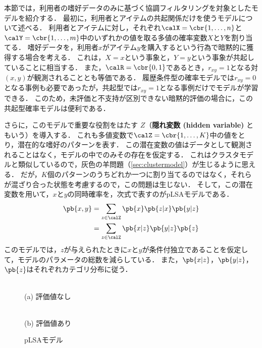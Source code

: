 本節では，利用者の嗜好データのみに基づく協調フィルタリングを対象としたモデル\cite{ijcai:99:01}を紹介する．
最初に，利用者とアイテムの共起関係だけを使うモデルについて述べる．
利用者とアイテムに対し，それぞれ$\calX=\cbr{1,\ldots,n}$と$\calY=\cbr{1,\ldots,m}$中のいずれかの値を取る多値の確率変数$X$と$Y$を割り当てる．
嗜好データを，利用者$x$がアイテム$y$を購入するという行為で暗黙的に獲得する場合を考える．
これは，$X=x$という事象と，$Y=y$という事象が共起していることに相当する．
また，$\calR=\cbr{0,1}$であるとき，$r_{xy}=1$となる対$(x,y)$が観測されることとも等価である．
履歴条件型の確率モデルでは$r_{xy}=0$となる事例も必要であったが，共起型では$r_{xy}=1$となる事例だけでモデルが学習できる．
このため，未評価と不支持が区別できない暗黙的評価の場合に，この共起型確率モデルは便利である．

さらに，このモデルで重要な役割をはたす $Z$（\textbf{隠れ変数 (hidden variable)} ともいう）を導入する．
これも多値変数で$\calZ=\cbr{1,\ldots,K}$中の値をとり，潜在的な嗜好のパターンを表す．
この潜在変数の値はデータとして観測されることはなく，モデルの中でのみその存在を仮定する．
これはクラスタモデルと類似しているので，灰色の羊問題（\ref{sec:clustermodel}）が生じるように思える．
だが，$K$個のパターンのうちどれか一つに割り当てるのではなく，それらが混ざり合った状態を考慮するので，この問題は生じない．
そして，この潜在変数を用いて，$x$と$y$の同時確率を，次式で表すのがpLSAモデルである．
\begin{align}
 \pb{x,y}& = \sum_{z\in \calZ}\pb{x}\pb{z|x}\pb{y|z}\label{eq:origplsamodel}\\
& = \sum_{z\in \calZ}\pb{x|z}\pb{y|z}\pb{z}
\label{eq:plsamodel}
\end{align}
このモデルでは，$z$が与えられたときに$x$と$y$が条件付独立であることを仮定して，モデルのパラメータの総数を減らしている．
また，$\pb{x|z}$，$\pb{y|z}$，$\pb{z}$はそれぞれカテゴリ分布に従う．

\begin{figure}
\centering
\begin{minipage}{0.3\fullwidth}
\centering
\setlength{\fboxsep}{0pt}
\\
(a) 評価値なし
\end{minipage}
\hspace{0.02\fullwidth}
\begin{minipage}{0.3\fullwidth}
\centering
\setlength{\fboxsep}{0pt}
\\
(b) 評価値あり
\end{minipage}
\caption{pLSAモデル\cite{ijcai:99:01}}
\label{fig:latentmodel}
\end{figure}

